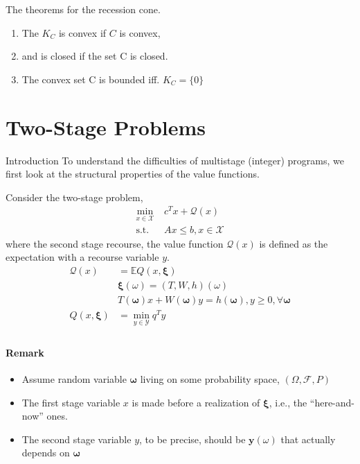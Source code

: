 \documentclass{beamerswitch}
\newcommand{\st}{\mathrm{s.t.\;}}
\newcommand{\ex}{\mathbb E}
\newcommand{\bxi}{\bm \xi}
\newcommand{\bo}{\bm \omega}
\theoremstyle{definition}
\begin{document}
\begin{theorem} The theorems for the recession cone.
    \begin{enumerate}[i]
        \item The \(K_C\) is convex if \(C\) is convex,
        \item and is closed if the set C is closed.
        \item The convex set C is bounded iff. \(K_C = \{0\}\)
    \end{enumerate}
\end{theorem}


\section{Two-Stage Problems}

\begin{frame}[allowframebreaks]{Introduction}
    To understand the difficulties of multistage (integer) programs, we first look at the structural properties of the value functions.

    Consider the two-stage problem,
    \begin{align*}
        \min_{x \in \mathcal X }~ & c^T x+ \mathcal Q (x)        \\
        \st                       & A x \leq b, x \in \mathcal X
    \end{align*}
    where the second stage recourse, the value function \(\mathcal Q (x) \) is defined as the expectation with a recourse variable \(y\).
    \begin{align*}
        \mathcal Q (x) & = \ex Q(x, \bxi)                                \\
                       & \bxi(\omega)    = (T, W, h )(\omega)            \\
                       & T(\bo) x+W(\bo) y=h(\bo), y \geq 0, \forall \bo \\
        Q(x, \bxi)     & = \min_{y \in \mathcal Y} q^T y                 \\
    \end{align*}

    \paragraph{Remark}
    \begin{itemize}
        \item Assume random variable \(\bo \) living on some probability space, \((\Omega,\mathcal F, P)\)
        \item The first stage variable \(x\) is made before a realization of \(\bxi\), i.e., the ``here-and-now'' ones.
        \item The second stage variable \(y\), to be precise, should be \(\bm y(\omega)\) that actually depends on \(\bo\)
    \end{itemize}
\end{frame}
\end{document}
